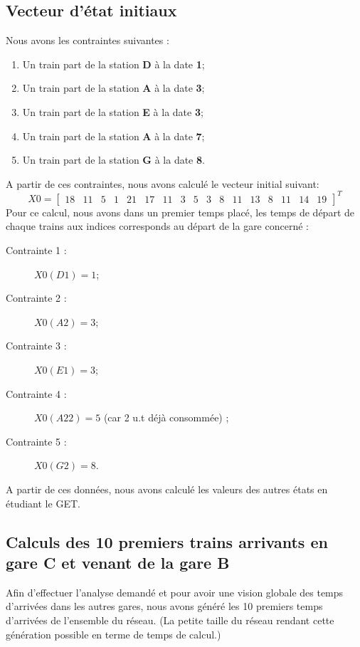 \subsection{Vecteur d'état initiaux}
Nous avons les contraintes suivantes : 
\begin{enumerate}
\item Un train part de la station \textbf{D} à la date \textbf{1};%
\item Un train part de la station \textbf{A} à la date \textbf{3};%
\item Un train part de la station \textbf{E} à la date \textbf{3};%
\item Un train part de la station \textbf{A} à la date \textbf{7};%
\item Un train part de la station \textbf{G} à la date \textbf{8}.%
\end{enumerate}
A partir de ces contraintes, nous avons calculé le vecteur initial suivant: 
\begin{equation}
X0 = 
\left[
\begin{array}{ccccccccccccccccc}
18  &11  &5   &1   &21  &17  &11  &3   &5   &3   &8   &11  &13  &8   &11  &14  &19 
\end{array} \right]^T
\end{equation}
Pour ce calcul, nous avons dans un premier temps placé, les temps de départ de chaque trains aux indices corresponds au départ de la gare concerné : 
\begin{description}

\item[Contrainte 1 :] $X0(D1) = 1$; 
\item[Contrainte 2 :] $X0(A2) = 3$; 
\item[Contrainte 3 :] $X0(E1) = 3$; 
\item[Contrainte 4 :] $X0(A22) = 5$ (car 2 u.t déjà consommée) ; 
\item[Contrainte 5 :] $X0(G2) = 8$. 
\end{description}
A partir de ces données, nous avons calculé les valeurs des autres états en étudiant le GET.


\subsection{Calculs des 10 premiers trains arrivants en gare C et venant de la gare B}
Afin d'effectuer l'analyse demandé et pour avoir une vision globale des temps d'arrivées dans les autres gares, nous avons généré les 10 premiers temps d'arrivées de l'ensemble du réseau. (La petite taille du réseau rendant cette génération possible en terme de temps de calcul.)

